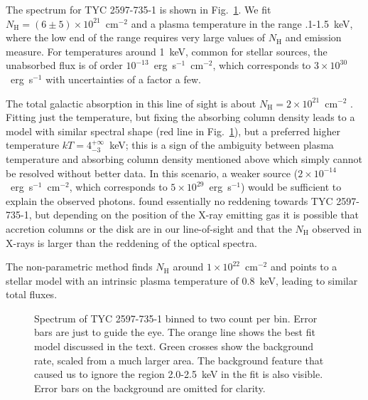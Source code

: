 \documentclass[]{aastex631}
\begin{document}
The spectrum for TYC 2597-735-1 is shown in Fig.~\ref{fig:TYC_spec}. We fit $N_\mathrm{H}=(6\pm5)\times10^{21}$~cm$^{-2}$ and a plasma temperature in the range .1-1.5~keV, where the low end of the range requires very large values of $N_\mathrm{H}$ and emission measure. For temperatures around 1~keV, common for stellar sources, the unabsorbed flux is of order $10^{-13}$~erg~s$^{-1}$~cm$^{-2}$, which corresponds to $3\times 10^{30}$~erg~s$^{-1}$ with uncertainties of a factor a few.

The total galactic absorption in this line of sight is about $N_\mathrm{H}=2\times10^{21}$~cm$^{-2}$ \citep{1990ARA&A..28..215D}. Fitting just the temperature, but fixing the absorbing column density leads to a model with similar spectral shape (red line in Fig.~\ref{fig:TYC_spec}), but a preferred higher temperature $kT=4_{-3}^{+\infty}$~keV; this is a sign of the ambiguity between plasma temperature and absorbing column density mentioned above which simply cannot be resolved without better data. In this scenario, a weaker source ($2\times10^{-14}$~erg~s$^{-1}$~cm$^{-2}$, which corresponds to $5\times 10^{29}$~erg~s$^{-1}$) would be sufficient to explain the observed photons. \cite{2020Natur.587..387H} found essentially no reddening towards TYC 2597-735-1, but depending on the position of the X-ray emitting gas it is possible that accretion columns or the disk are in our line-of-sight and that the $N_\mathrm{H}$ observed in X-rays is larger than the reddening of the optical spectra. 

The non-parametric method finds $N_\mathrm{H}$ around $1\times10^{22}$~cm$^{-2}$ and points to a stellar model with an intrinsic plasma temperature of 0.8~keV, leading to similar total fluxes.

\begin{figure}
    \caption{Spectrum of TYC 2597-735-1 binned to two count per bin. Error bars are just to guide the eye. The orange line shows the best fit model discussed in the text. Green crosses show the background rate, scaled from a much larger area. The background feature that caused us to ignore the region 2.0-2.5~keV in the fit is also visible. Error bars on the background are omitted for clarity.
    \label{fig:TYC_spec}}
\end{figure}
\end{document}
